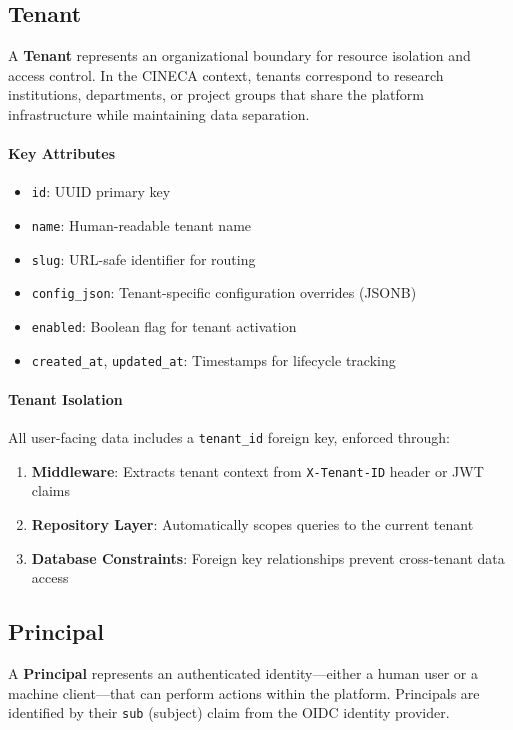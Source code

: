\subsection{Tenant}

A \textbf{Tenant} represents an organizational boundary for resource isolation and access control. In the CINECA context, tenants correspond to research institutions, departments, or project groups that share the platform infrastructure while maintaining data separation.

\paragraph{Key Attributes}
\begin{itemize}
    \item \texttt{id}: UUID primary key
    \item \texttt{name}: Human-readable tenant name
    \item \texttt{slug}: URL-safe identifier for routing
    \item \texttt{config\_json}: Tenant-specific configuration overrides (JSONB)
    \item \texttt{enabled}: Boolean flag for tenant activation
    \item \texttt{created\_at}, \texttt{updated\_at}: Timestamps for lifecycle tracking
\end{itemize}

\paragraph{Tenant Isolation}
All user-facing data includes a \texttt{tenant\_id} foreign key, enforced through:
\begin{enumerate}
    \item \textbf{Middleware}: Extracts tenant context from \texttt{X-Tenant-ID} header or JWT claims
    \item \textbf{Repository Layer}: Automatically scopes queries to the current tenant
    \item \textbf{Database Constraints}: Foreign key relationships prevent cross-tenant data access
\end{enumerate}

\subsection{Principal}

A \textbf{Principal} represents an authenticated identity---either a human user or a machine client---that can perform actions within the platform. Principals are identified by their \texttt{sub} (subject) claim from the OIDC identity provider.

